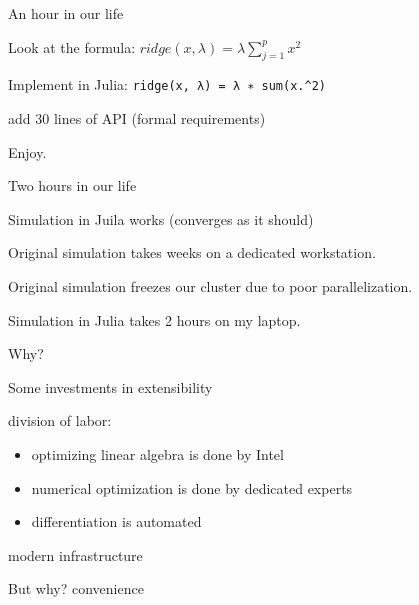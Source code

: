\documentclass{beamer}
\newcommand{\monob}[1]{\mbox{\texttt{\textcolor{mypurple}{#1}}}}
\newenvironment{wideitemize}{
    \itemize\addtolength{\itemsep}{15pt}\addtolength{\topsep}{10pt}}{\enditemize}
\begin{document}
    \begin{frame}{An hour in our life}
      \begin{wideitemize}
        \item Look at the formula: $ridge(x, \lambda{}) = \lambda{}\sum^p_{j=1}x^2$
        \item Implement in Julia: \monob{ridge(x, λ) = λ ∗ sum(x.\^{}2)}
        \item add 30 lines of API (formal requirements)
        \item Enjoy.
      \end{wideitemize}
    \end{frame}

    \begin{frame}{Two hours in our life}
        \begin{wideitemize}
        \item Simulation in Juila works (converges as it should)
        \item<2> Original simulation takes weeks on a dedicated workstation.
        \item<2> Original simulation freezes our cluster due to poor parallelization.
        \item<2> Simulation in Julia takes 2 hours on my laptop.
        \end{wideitemize}
    \end{frame}

    \begin{frame}{Why?}
        \begin{wideitemize}
        \item Some investments in extensibility
        \item division of labor: \begin{itemize}
            \item optimizing linear algebra is done by Intel
            \item numerical optimization is done by dedicated experts
            \item differentiation is automated
        \end{itemize}
        \item modern infrastructure
        \end{wideitemize}
    \end{frame}

    \begin{frame}{But why?}
    \centering \huge convenience
    \end{frame}
\end{document}
